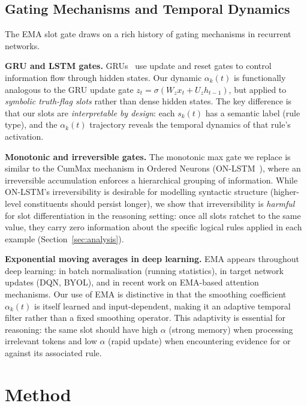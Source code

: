 \documentclass[conference]{IEEEtran}
\begin{document}
\subsection{Gating Mechanisms and Temporal Dynamics}

The EMA slot gate draws on a rich history of gating mechanisms
in recurrent networks.

\textbf{GRU and LSTM gates.}
GRUs~\cite{cho2014gru} use update and reset gates to control
information flow through hidden states.  Our dynamic $\alpha_k(t)$
is functionally analogous to the GRU update gate
$z_t = \sigma(W_z x_t + U_z h_{t-1})$, but applied to
\emph{symbolic truth-flag slots} rather than dense hidden states.
The key difference is that our slots are \emph{interpretable by
design}: each $s_k(t)$ has a semantic label (rule type), and the
$\alpha_k(t)$ trajectory reveals the temporal dynamics of that
rule's activation.

\textbf{Monotonic and irreversible gates.}
The monotonic max gate we replace is similar to the CumMax
mechanism in Ordered Neurons (ON-LSTM~\cite{shen2019ordered}),
where an irreversible accumulation enforces a hierarchical
grouping of information.  While ON-LSTM's irreversibility is
desirable for modelling syntactic structure (higher-level
constituents should persist longer), we show that irreversibility
is \emph{harmful} for slot differentiation in the reasoning
setting: once all slots ratchet to the same value, they carry
zero information about the specific logical rules applied in each
example (Section~\ref{sec:analysis}).

\textbf{Exponential moving averages in deep learning.}
EMA appears throughout deep learning: in batch normalisation
(running statistics), in target network updates
(DQN, BYOL), and in recent work on EMA-based attention
mechanisms.  Our use of EMA is distinctive in that the smoothing
coefficient $\alpha_k(t)$ is itself learned and input-dependent,
making it an adaptive temporal filter rather than a fixed
smoothing operator.  This adaptivity is essential for reasoning:
the same slot should have high $\alpha$ (strong memory) when
processing irrelevant tokens and low $\alpha$ (rapid update) when
encountering evidence for or against its associated rule.


\section{Method}
\label{sec:method}
\end{document}
